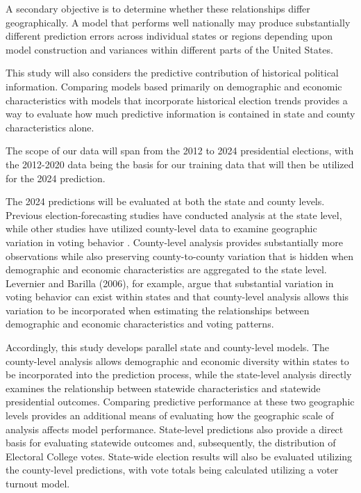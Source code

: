 \documentclass[12pt]{article}
\begin{document}
	A secondary objective is to determine whether these relationships
	differ geographically. A model that performs well nationally may
	produce substantially different prediction errors across individual
	states or regions depending upon model construction and variances within different parts of the United States.
	
	This study will also considers the predictive contribution of historical
	political information. Comparing models based primarily on demographic
	and economic characteristics with models that incorporate
	historical election trends provides a way to evaluate how much
	predictive information is contained in state and county
	characteristics alone. 
	
	The scope of our data will span from the 2012 to 2024 presidential elections, with the 2012-2020 data being the basis for our training data that will then be utilized for the 2024 prediction.
	
	The 2024 predictions will be evaluated at both the state and county levels. Previous election-forecasting studies have conducted analysis at the state level\cite{zolghadr2018}, while other studies have utilized county-level data to examine geographic variation in voting behavior \cite{levernier2006}\cite{fotheringham2021}\cite{pesaran2024}. County-level analysis provides substantially more observations while also preserving county-to-county variation that is hidden when demographic and economic characteristics are aggregated to the state level. Levernier and Barilla (2006), for example, argue that substantial variation in voting behavior can exist within states and that county-level analysis allows this variation to be incorporated when estimating the relationships between demographic and economic characteristics and voting patterns.
	
	Accordingly, this study develops parallel state and county-level models. The county-level analysis allows demographic and economic diversity within states to be incorporated into the prediction process, while the state-level analysis directly examines the relationship between statewide characteristics and statewide presidential outcomes. Comparing predictive performance at these two geographic levels provides an additional means of evaluating how the geographic scale of analysis affects model performance. State-level predictions also provide a direct basis for evaluating statewide outcomes and, subsequently, the distribution of Electoral College votes. State-wide election results will also be evaluated utilizing the county-level predictions, with vote totals being calculated utilizing a voter turnout model.
	
\end{document}
